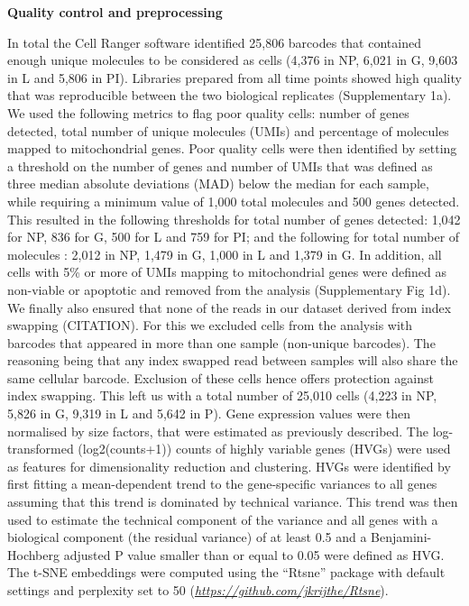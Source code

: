 \documentclass[titlepage, 12pt, oneside]{amsart}
\begin{document}
\textbf{Quality control and preprocessing}

In total the Cell Ranger software identified 25,806 barcodes that contained enough unique molecules to be considered as cells (4,376 in NP, 6,021 in G, 9,603 in L and 5,806 in PI).
Libraries prepared from all time points showed high quality that was reproducible between the two biological replicates (Supplementary 1a).
We used the following metrics to flag poor quality cells: number of genes detected, total number of unique molecules (UMIs) and percentage of molecules mapped to mitochondrial genes.
Poor quality cells were then identified by setting a threshold on the number of genes and number of UMIs that was defined as three median absolute deviations (MAD) below the median for each sample, while requiring a minimum value of 1,000 total molecules and 500 genes detected.  
This resulted in the following thresholds for total number of genes detected: 1,042 for NP, 836 for G, 500 for L and 759 for PI; and the following for total number of molecules : 2,012 in NP, 1,479 in G, 1,000 in L and 1,379 in G.
In addition, all cells with 5\% or more of UMIs mapping to mitochondrial genes were defined as non-viable or apoptotic and removed from the analysis (Supplementary Fig 1d).
We finally also ensured that none of the reads in our dataset derived from index swapping (CITATION).
For this we excluded cells from the analysis with barcodes that appeared in more than one sample (non-unique barcodes).
The reasoning being that any index swapped read between samples will also share the same cellular barcode.
Exclusion of these cells hence offers protection against index swapping.
This left us with a total number of 25,010 cells (4,223 in NP, 5,826 in G, 9,319 in L and 5,642 in P).
Gene expression values were then normalised by size factors, that were estimated as previously described\autocite{Lun2016}.
The log-transformed (log2(counts+1)) counts of highly variable genes (HVGs) were used as features for dimensionality reduction and clustering.
HVGs were identified by first fitting a mean-dependent trend to the gene-specific variances to all genes assuming that this trend is dominated by technical variance.
This trend was then used to estimate the technical component of the variance and all genes with a biological component (the residual variance) of at least 0.5 and a Benjamini-Hochberg adjusted P value smaller than or equal to 0.05 were defined as HVG.
The t-SNE embeddings were computed using the ``Rtsne'' package with default settings and perplexity set to 50 (\href{https://github.com/jkrijthe/Rtsne}{\textit{https://github.com/jkrijthe/Rtsne}}).
\end{document}
